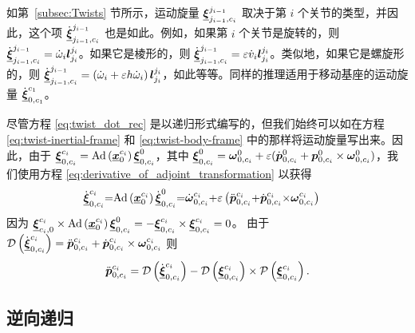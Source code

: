 如第~\ref{subsec:Twists} 节所示，运动旋量 $\underline{\boldsymbol{\xi}}_{j_{i-1},c_{i}}^{j_{i-1}}$ 取决于第 $i$ 个关节的类型，并因此，这个项 $\dot{\underline{\boldsymbol{\xi}}}_{j_{i-1},c_{i}}^{j_{i-1}}$ 也是如此。例如，如果第 $i$ 个关节是旋转的，则 $\dot{\underline{\boldsymbol{\xi}}}_{j_{i-1},c_{i}}^{j_{i-1}}=\dot{\omega}_{i}\boldsymbol{l}_{j_{i}}^{j_{i}}$。如果它是棱形的，则 $\dot{\underline{\boldsymbol{\xi}}}_{j_{i-1},c_{i}}^{j_{i-1}}=\varepsilon\dot{v}_{i}\boldsymbol{l}_{j_{i}}^{j_{i}}$。类似地，如果它是螺旋形的，则 $\dot{\underline{\boldsymbol{\xi}}}_{j_{i-1},c_{i}}^{j_{i-1}}=\left(\dot{\omega}_{i}+\varepsilon h\dot{\omega}_{i}\right)\boldsymbol{l}_{j_{i}}^{j_{i}}$，如此等等。同样的推理适用于移动基座的运动旋量 $\dot{\underline{\boldsymbol{\xi}}}_{0,c_{1}}^{c_{1}}$。

%

%
\begin{remark}

尽管方程 \eqref{eq:twist_dot_rec} 是以递归形式编写的，但我们始终可以如在方程 \eqref{eq:twist-inertial-frame} 和 \eqref{eq:twist-body-frame} 中的那样将运动旋量写出来。因此，由于 $\underline{\boldsymbol{\xi}}_{0,c_{i}}^{c_{i}}=\mathrm{Ad}\left(\underline{\boldsymbol{x}}_{0}^{c_{i}}\right)\underline{\boldsymbol{\xi}}_{0,c_{i}}^{0}$，其中 $\underline{\boldsymbol{\xi}}_{0,c_{i}}^{0}=\boldsymbol{\omega}_{0,c_{i}}^{0}+\varepsilon(\dot{\boldsymbol{p}}_{0,c_{i}}^{0}+\boldsymbol{p}_{0,c_{i}}^{0}\times\boldsymbol{\omega}_{0,c_{i}}^{0})$，我们使用方程 \eqref{eq:derivative_of_adjoint_transformation} 以获得
\begin{align}
\dot{\underline{\boldsymbol{\xi}}}_{0,c_{i}}^{c_{i}} & {=}\mathrm{Ad}\left(\underline{\boldsymbol{x}}_{0}^{c_{i}}\right)\dot{\underline{\boldsymbol{\xi}}}_{0,c_{i}}^{0}{=}\dot{\boldsymbol{\omega}}_{0,c_{i}}^{c_{i}}{+}\varepsilon\left(\ddot{\boldsymbol{p}}_{0,c_{i}}^{c_{i}}{+}\dot{\boldsymbol{p}}_{0,c_{i}}^{c_{i}}{\times}\boldsymbol{\omega}_{0,c_{i}}^{c_{i}}\right)\label{eq:twist_derivative_explicit_form}
\end{align}
 因为 $\underline{\boldsymbol{\xi}}_{c_{i},0}^{c_{i}}\times\mathrm{Ad}\left(\underline{\boldsymbol{x}}_{0}^{c_{i}}\right)\underline{\boldsymbol{\xi}}_{0,c_{i}}^{0}=-\underline{\boldsymbol{\xi}}_{0,c_{i}}^{c_{i}}\times\underline{\boldsymbol{\xi}}_{0,c_{i}}^{c_{i}}=0$。
由于 $\operatorname{\mathcal{D}}\left(\dot{\underline{\boldsymbol{\xi}}}_{0,c_{i}}^{c_{i}}\right)=\ddot{\boldsymbol{p}}_{0,c_{i}}^{c_{i}}+\dot{\boldsymbol{p}}_{0,c_{i}}^{c_{i}}\times\boldsymbol{\omega}_{0,c_{i}}^{c_{i}}$
则
\begin{gather}
\ddot{\boldsymbol{p}}_{0,c_{i}}^{c_{i}}=\operatorname{\mathcal{D}}\left(\dot{\underline{\boldsymbol{\xi}}}_{0,c_{i}}^{c_{i}}\right)-\operatorname{\mathcal{D}}\left(\underline{\boldsymbol{\xi}}_{0,c_{i}}^{c_{i}}\right)\times\operatorname{\mathcal{P}}\left(\underline{\boldsymbol{\xi}}_{0,c_{i}}^{c_{i}}\right).\label{eq:linear-acceleration}
\end{gather}

\end{remark}

\subsection{\normalfont\bfseries 逆向递归\label{subsec:dqNE_backward_recursion}}

